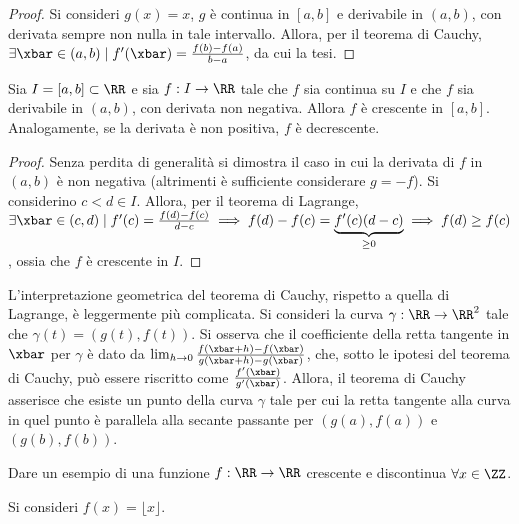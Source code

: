 \documentclass[11pt]{article}
\begin{document}
	\begin{proof}
		Si consideri $g(x) = x$, $g$ è continua in $[a, b]$ e derivabile
		in $(a, b)$, con derivata sempre non nulla in tale intervallo.
		Allora, per il teorema di Cauchy, $\exists \xbar \in (a, b) \mid
		f'(\xbar) = \frac{f(b)-f(a)}{b-a}$, da cui la tesi.
	\end{proof}

	\begin{proposition}
		Sia $I = [a, b] \subset \RR$ e sia $f : I \to \RR$ tale che $f$
		sia continua su $I$ e che $f$ sia derivabile in $(a, b)$, con
		derivata non negativa. Allora $f$ è crescente in $[a, b]$.
		Analogamente, se la derivata è non positiva, $f$ è decrescente.
	\end{proposition}

	\begin{proof}
		Senza perdita di generalità si dimostra il caso in cui la derivata
		di $f$ in $(a, b)$ è non negativa (altrimenti è sufficiente considerare
		$g = -f$).
		Si considerino $c < d \in I$. Allora, per il teorema di Lagrange,
		$\exists \xbar \in (c, d) \mid f'(c) = \frac{f(d) - f(c)}{d-c}
		\implies f(d) - f(c) = \underbrace{f'(c) (d-c)}_{\geq 0} \implies
		f(d) \geq f(c)$, ossia che $f$ è crescente in $I$.
	\end{proof}

	\begin{remark}\nl
		\li L'interpretazione geometrica del teorema di Cauchy, rispetto
		a quella di Lagrange, è leggermente più complicata. Si consideri
		la curva $\gamma : \RR \to \RR^2$ tale che
		$\gamma(t) =(g(t), f(t))$. Si osserva che il coefficiente della
		retta tangente in $\xbar$ per $\gamma$ è dato da $\lim_{h \to 0} \frac{f(\xbar + h) - f(\xbar)}{g(\xbar + h) - g(\xbar)}$, che,
		sotto le ipotesi del teorema di Cauchy, può essere riscritto
		come $\frac{f'(\xbar)}{g'(\xbar)}$. Allora, il teorema di Cauchy
		asserisce che esiste un punto della curva $\gamma$ tale per cui
		la retta tangente alla curva in quel punto è parallela alla secante
		passante per $(g(a), f(a))$ e $(g(b), f(b))$.
	\end{remark}

	\begin{exercise}
		Dare un esempio di una funzione $f : \RR \to \RR$ crescente e
		discontinua $\forall x \in \ZZ$.
	\end{exercise}

	\begin{solution}
		Si consideri $f(x) = \lfloor x \rfloor$.
	\end{solution}
\end{document}
